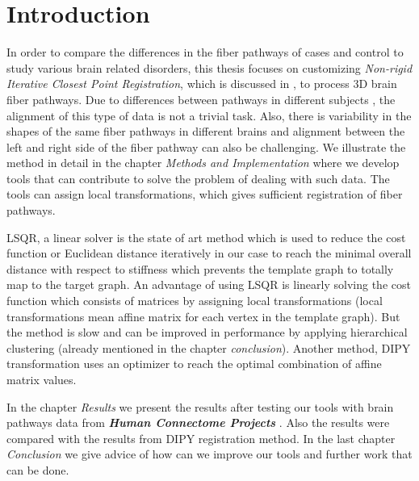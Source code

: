 \documentclass[../structure.tex]{subfiles}
\begin{document}
\chapter{Introduction}
In order to compare the differences in the fiber pathways of cases and control to study various brain related disorders, this thesis focuses on customizing \textit{Non-rigid Iterative Closest Point Registration}, which is discussed in \cite{Amberg2007}, to process 3D brain fiber pathways. Due to differences between pathways in different subjects , the alignment of this type of data is not a trivial task. Also, there is variability in the shapes of the same fiber pathways in different brains and alignment between the left and right side of the fiber pathway can also be challenging. We illustrate the method in detail in the chapter \textit{Methods and Implementation} where we develop tools that can contribute to solve the problem of dealing with such data. The tools can assign local transformations, which gives sufficient registration of fiber pathways. 

LSQR, a linear solver is the state of art method which is used to reduce the cost function or Euclidean distance iteratively in our case to reach the minimal overall distance with respect to stiffness which prevents the template graph to totally map to the target graph. An advantage of using LSQR is linearly solving the cost function which consists of matrices by assigning local transformations (local transformations mean affine matrix for each vertex in the template graph). But the method is slow and can be improved in performance by applying hierarchical clustering (already mentioned in the chapter \textit{conclusion}). Another method, DIPY transformation uses an optimizer to reach the optimal combination of affine matrix values.

In the chapter \textit{Results} we present the results after testing our tools with brain pathways data from \textbf{\textit{Human Connectome Projects}} \cite{CCF}. Also the results were compared with the results from DIPY registration method. In the last chapter \textit{Conclusion} we give advice of how can we improve our tools and further work that can be done.
\end{document}
